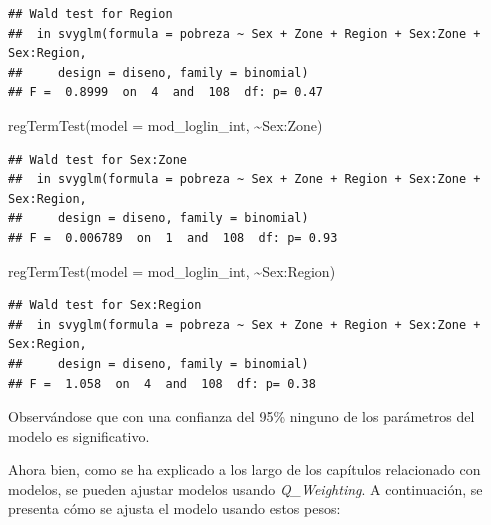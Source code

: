 \documentclass[
  12pt,
]{book}
\newenvironment{Shaded}{\begin{snugshade}}{\end{snugshade}}
\newcommand{\AttributeTok}[1]{\textcolor[rgb]{0.77,0.63,0.00}{#1}}
\newcommand{\FunctionTok}[1]{\textcolor[rgb]{0.00,0.00,0.00}{#1}}
\newcommand{\NormalTok}[1]{#1}
\newcommand{\SpecialCharTok}[1]{\textcolor[rgb]{0.00,0.00,0.00}{#1}}
\begin{document}
\begin{verbatim}
## Wald test for Region
##  in svyglm(formula = pobreza ~ Sex + Zone + Region + Sex:Zone + Sex:Region, 
##     design = diseno, family = binomial)
## F =  0.8999  on  4  and  108  df: p= 0.47
\end{verbatim}

\begin{Shaded}
\begin{Highlighting}[]
  \FunctionTok{regTermTest}\NormalTok{(}\AttributeTok{model =}\NormalTok{ mod\_loglin\_int, }\SpecialCharTok{\textasciitilde{}}\NormalTok{Sex}\SpecialCharTok{:}\NormalTok{Zone)}
\end{Highlighting}
\end{Shaded}

\begin{verbatim}
## Wald test for Sex:Zone
##  in svyglm(formula = pobreza ~ Sex + Zone + Region + Sex:Zone + Sex:Region, 
##     design = diseno, family = binomial)
## F =  0.006789  on  1  and  108  df: p= 0.93
\end{verbatim}

\begin{Shaded}
\begin{Highlighting}[]
  \FunctionTok{regTermTest}\NormalTok{(}\AttributeTok{model =}\NormalTok{ mod\_loglin\_int, }\SpecialCharTok{\textasciitilde{}}\NormalTok{Sex}\SpecialCharTok{:}\NormalTok{Region)}
\end{Highlighting}
\end{Shaded}

\begin{verbatim}
## Wald test for Sex:Region
##  in svyglm(formula = pobreza ~ Sex + Zone + Region + Sex:Zone + Sex:Region, 
##     design = diseno, family = binomial)
## F =  1.058  on  4  and  108  df: p= 0.38
\end{verbatim}

Observándose que con una confianza del 95\% ninguno de los parámetros del modelo es significativo.

Ahora bien, como se ha explicado a los largo de los capítulos relacionado con modelos, se pueden ajustar modelos usando \emph{Q\_Weighting}. A continuación, se presenta cómo se ajusta el modelo usando estos pesos:
\end{document}
